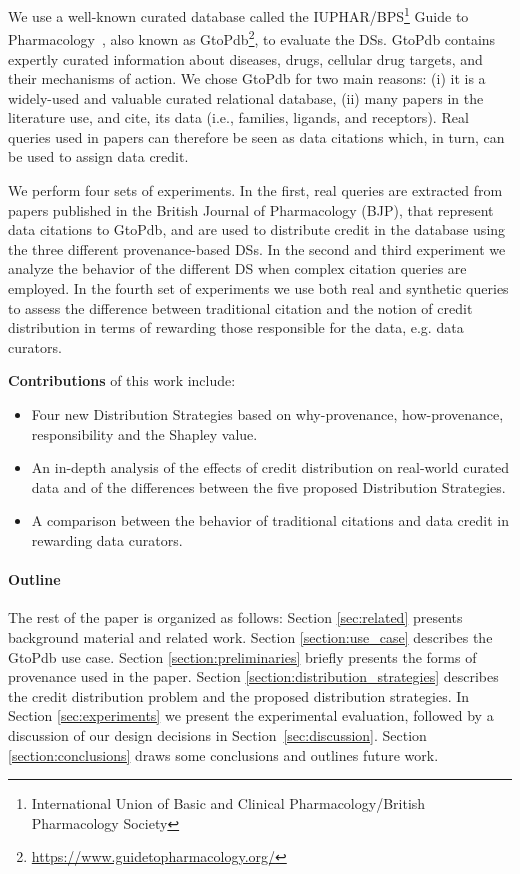 \documentclass[preprint,12pt,sort&compress]{elsarticle}
\newcommand{\rone}[1]{\textcolor{reviewer1}{#1}}
\newcommand{\rtwo}[1]{\textcolor{reviewer2}{#1}}
\begin{document}
We use a well-known curated database called the IUPHAR/BPS\footnote{International Union of Basic and Clinical Pharmacology/British Pharmacology Society} Guide to Pharmacology~\citep{iuphar2018}, also known as GtoPdb\footnote{\url{https://www.guidetopharmacology.org/}}, to evaluate the DSs.  GtoPdb contains expertly curated information about diseases, drugs, cellular drug targets, and their mechanisms of action.
We chose GtoPdb for two main reasons: (i) it is a widely-used and valuable curated relational database, (ii) many papers in the literature use, and cite, its data (i.e., families, ligands, and receptors). 
Real queries used in papers can therefore be seen as data citations which, in turn, can be used to assign data credit.

We perform four sets of experiments. In the first, real queries are extracted from papers published in the British Journal of Pharmacology (BJP), that represent data citations to GtoPdb, and are used to distribute credit in the database using the three different provenance-based DSs. 
In the second and third experiment we analyze the behavior of the different DS when complex citation queries are employed.
In the fourth set of experiments we use both real and synthetic queries to assess the difference between traditional citation and the notion of credit distribution in terms of rewarding those responsible for the data, e.g. data curators.

\textbf{Contributions}
 of this work include:
\begin{itemize}
    \item \rone{Four new Distribution Strategies based on why-provenance, how-provenance, \rtwo{responsibility and the Shapley value}.}
    \item An in-depth analysis of the effects of credit distribution on real-world curated data and of the differences between the five proposed Distribution Strategies.
    \item A comparison between the behavior of traditional citations and data credit in rewarding data curators.
\end{itemize}

\paragraph{\textbf{Outline}} The rest of the paper is organized as follows:
Section \ref{sec:related} presents background material and related work.   Section \ref{section:use_case} describes the GtoPdb use case. Section \ref{section:preliminaries} briefly presents the forms of provenance used in the paper.  Section \ref{section:distribution_strategies} describes the credit distribution problem and the proposed distribution strategies.  In Section \ref{sec:experiments} we present the experimental evaluation, followed by a discussion of our design decisions in Section~\ref{sec:discussion}. Section \ref{section:conclusions} draws some conclusions and outlines future work.
\end{document}
